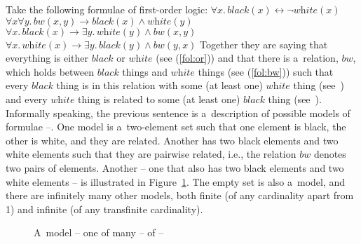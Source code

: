 \documentclass[output=paper,hidelinks]{langscibook}
\begin{document}
Take the following formulae of first-order logic:
\ea\label{fol:or} $\forall x.\, \textit{black}(x) \leftrightarrow \neg \textit{white}(x)$
\ex\label{fol:bw} $\forall x\forall y.\, \textit{bw}(x,y) \rightarrow \textit{black}(x) \land \textit{white}(y)$
\ex\label{fol:ifbthw} $\forall x.\, \textit{black}(x) \rightarrow \exists y.\, \textit{white}(y) \land \textit{bw}(x,y)$
\ex\label{fol:ifwthb} $\forall x.\, \textit{white}(x) \rightarrow \exists y.\, \textit{black}(y) \land \textit{bw}(y,x)$
\z
Together they are saying that everything is either $\textit{black}$ or $\textit{white}$ (see (\ref{fol:or})) and that there is a~relation, $\textit{bw}$, which holds between $\textit{black}$ things and $\textit{white}$ things (see (\ref{fol:bw})) such that every $\textit{black}$ thing is in this relation with some (at least one) $\textit{white}$ thing (see~) and every $\textit{white}$ thing is related to some (at least one) $\textit{black}$ thing (see~).  Informally speaking, the previous sentence is a~description of possible models of formulae --.  One model is a~two-element set such that one element is black, the other is white, and they are related.  Another has two black elements and two white elements such that they are pairwise related, i.e., the relation $\textit{bw}$ denotes two pairs of elements.  Another -- one that also has two black elements and two white elements -- is illustrated in Figure~\ref{fig:bw}. The empty set is also a~model, and there are infinitely many other models, both finite (of any cardinality apart from 1) and infinite (of any transfinite cardinality).

\begin{figure}
  \caption{A~model -- one of many -- of --\label{fig:bw}}
\end{figure}
 
\end{document}
